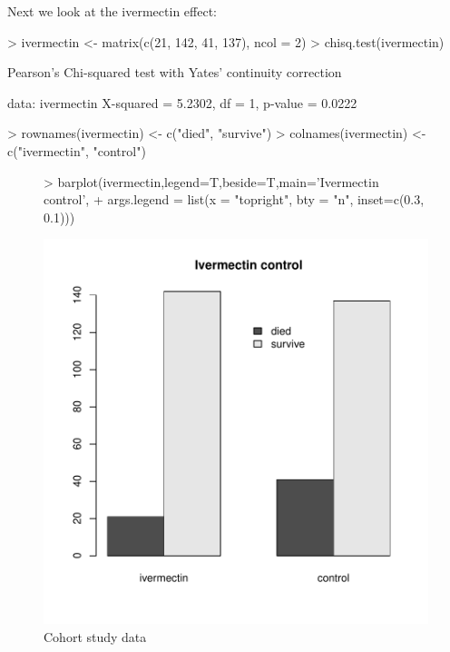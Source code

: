 \documentclass{article}
\begin{document}
Next we look at the ivermectin effect:

\begin{Schunk}
\begin{Sinput}
> ivermectin <- matrix(c(21, 142, 41, 137), ncol = 2)
> chisq.test(ivermectin)
\end{Sinput}
\begin{Soutput}
	Pearson's Chi-squared test with Yates' continuity correction

data:  ivermectin
X-squared = 5.2302, df = 1, p-value = 0.0222
\end{Soutput}
\begin{Sinput}
> rownames(ivermectin) <- c("died", "survive")
> colnames(ivermectin) <- c("ivermectin", "control")
\end{Sinput}
\end{Schunk}

\begin{figure}
\begin{Schunk}
\begin{Sinput}
> barplot(ivermectin,legend=T,beside=T,main='Ivermectin control',
+          args.legend = list(x = "topright", bty = "n", inset=c(0.3, 0.1)))
\end{Sinput}
\end{Schunk}
\includegraphics{Fig-test3}
\caption{Cohort study data}
\label{fig:p}
\end{figure}
\end{document}
